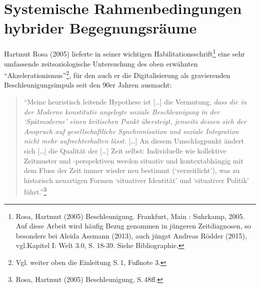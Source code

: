 \documentclass[a4paper,
fontsize=11pt,
oneside,
numbers=noperiodatend,
parskip=half-,
bibliography=totoc,
final
]{scrartcl}
\begin{document}
\section*{Systemische Rahmenbedingungen hybrider
Begegnungsräume}\label{systemische-rahmenbedingungen-hybrider-begegnungsruxe4ume}

Hartmut Rosa (2005) lieferte in seiner wichtigen
Habilitationsschrift\footnote{Rosa, Hartmut (2005) Beschleunigung.
  Frankfurt, Main : Suhrkamp, 2005. Auf diese Arbeit wird häufig Bezug
  genommen in jüngeren Zeitdiagnosen, so besonders bei Aleida Assmann
  (2013), auch jüngst Andreas Rödder (2015), vgl.Kapitel I: Welt 3.0, S.
  18-39. Siehe Bibliographie.} eine sehr umfassende zeitsoziologische
Untersuchung des oben erwähnten \enquote{Akzelerationismus}\footnote{Vgl.
  weiter oben die Einleitung S.\,1, Fußnote 3.}, für den auch er die
Digitalisierung als gravierenden Beschleunigungsimpuls seit den 90er
Jahren ausmacht:

\begin{quote}
\enquote{Meine heuristisch leitende Hypothese ist {[}\ldots{}{]} die
Vermutung, \emph{dass die in der Moderne konstitutiv angelegte soziale
Beschleunigung in der \enquote{Spätmoderne} einen kritischen Punkt
übersteigt, jenseits dessen sich der Anspruch auf gesellschaftliche
Synchronisation und soziale Integration nicht mehr aufrechterhalten
lässt.} {[}\ldots{}{]} An diesem Umschlagpunkt ändert sich
{[}\ldots{}{]} die Qualität der {[}\ldots{}{]} Zeit selbst: Individuelle
wie kollektive Zeitmuster und -perspektiven werden situativ und
kontextabhängig mit dem Fluss der Zeit immer wieder neu bestimmt
(\enquote{verzeitlicht}), was zu historisch neuartigen Formen
\enquote{situativer Identität} und \enquote{situativer Politik}
führt.}\footnote{Rosa, Hartmut (2005) Beschleunigung, S.\,48ff.}
\end{quote}
\end{document}
